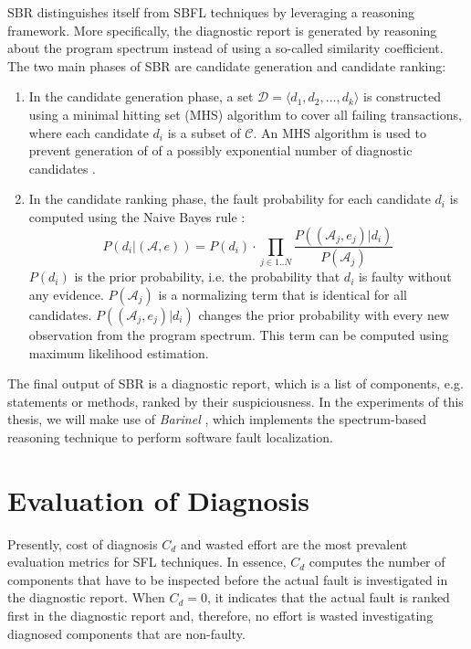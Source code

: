 \documentclass[twoside,a4paper,11pt]{memoir}
\begin{document}
SBR distinguishes itself from SBFL techniques by leveraging a reasoning framework.
More specifically, the diagnostic report is generated by reasoning about the program spectrum instead of using a so-called similarity coefficient.
The two main phases of SBR are candidate generation and candidate ranking:
\begin{enumerate}
  \item In the candidate generation phase, a set $\mathcal{D} = \langle d_1, d_2, \dots, d_k \rangle$ is constructed using a minimal hitting set (MHS) algorithm to cover all failing transactions, where each candidate $d_i$ is a subset of $\mathcal{C}$.
  An MHS algorithm is used to prevent generation of of a possibly exponential number of diagnostic candidates \cite{Abreu:2009:SMF:1747491.1747511}.

  \item In the candidate ranking phase, the fault probability for each candidate $d_i$ is computed using the Naive Bayes rule \cite{Abreu:2009:SMF:1747491.1747511}:
  \begin{equation}
    P(d_i | (\mathcal{A}, e)) = P(d_i) \cdot \prod_{j \in 1..N} \frac{P((\mathcal{A}_j, e_j) | d_i)}{P(\mathcal{A}_j)}
  \end{equation}
  $P(d_i)$ is the prior probability, i.e. the probability that $d_i$ is faulty without any evidence.
  $P(\mathcal{A}_j)$ is a normalizing term that is identical for all candidates.
  $P((\mathcal{A}_j, e_j) | d_i)$ changes the prior probability with every new observation from the program spectrum.
  This term can be computed using maximum likelihood estimation.
\end{enumerate}

The final output of SBR is a diagnostic report, which is a list of components, e.g. statements or methods, ranked by their suspiciousness.
In the experiments of this thesis, we will make use of \emph{Barinel} \cite{Abreu:2009:SMF:1747491.1747511}, which implements the spectrum-based reasoning technique to perform software fault localization.

\section{Evaluation of Diagnosis}
Presently, cost of diagnosis $C_d$ and wasted effort \cite{Abreu:2009:SMF:1747491.1747511, 7390282, 6693085, Steimann:2013:TVV:2483760.2483767, DBLP:conf/icse/PerezAD17} are the most prevalent evaluation metrics for SFL techniques.
In essence, $C_d$ computes the number of components that have to be inspected before the actual fault is investigated in the diagnostic report.
When $C_d = 0$, it indicates that the actual fault is ranked first in the diagnostic report and, therefore, no effort is wasted investigating diagnosed components that are non-faulty.
\end{document}
